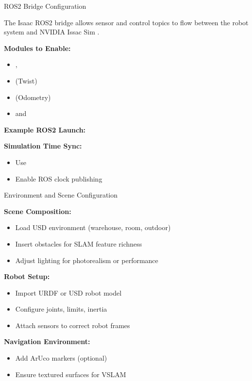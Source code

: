 \begin{frame}{ROS2 Bridge Configuration}

The Isaac ROS2 bridge allows sensor and control topics to flow between 
the robot system and NVIDIA Issac Sim \cite{ROSBridge:2024}.

\textbf{Modules to Enable:}
\begin{itemize}
    \item {},   
    \item {} (Twist)  
    \item {} (Odometry)  
    \item {} and   
\end{itemize}

\textbf{Example ROS2 Launch:}



\textbf{Simulation Time Sync:}
\begin{itemize}
    \item Use   
    \item Enable ROS clock publishing  
\end{itemize}

\end{frame}

\begin{frame}{Environment and Scene Configuration}

\textbf{Scene Composition:}
\begin{itemize}
    \item Load USD environment (warehouse, room, outdoor)  
    \item Insert obstacles for SLAM feature richness  
    \item Adjust lighting for photorealism or performance  
\end{itemize}

\textbf{Robot Setup:}
\begin{itemize}
    \item Import URDF or USD robot model  
    \item Configure joints, limits, inertia  
    \item Attach sensors to correct robot frames  
\end{itemize}

\textbf{Navigation Environment:}
\begin{itemize}
    \item Add ArUco markers (optional)  
    \item Ensure textured surfaces for VSLAM  
\end{itemize}

\end{frame}

